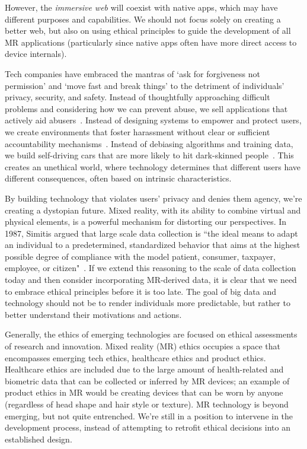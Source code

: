 However, the \emph{immersive web} will coexist with native apps, which may have different purposes and capabilities. We should not focus solely on creating a better web, but also on using ethical principles to guide the development of all MR applications (particularly since native apps often have more direct access to device internals).

Tech companies have embraced the mantras of `ask for forgiveness not permission' and `move fast and break things' to the detriment of individuals' privacy, security, and safety. Instead of thoughtfully approaching difficult problems and considering how we can prevent abuse, we sell applications that actively aid abusers~\cite{dell}. Instead of designing systems to empower and protect users, we create environments that foster harassment without clear or sufficient accountability mechanisms~\cite{dreyfuss}. Instead of debiasing algorithms and training data, we build self-driving cars that are more likely to hit dark-skinned people~\cite{wilson2019predictive}. This creates an unethical world, where technology determines that different users have different consequences, often based on intrinsic characteristics.

By building technology that violates users' privacy and denies them agency, we're creating a dystopian future. Mixed reality, with its ability to combine virtual and physical elements, is a powerful mechanism for distorting our perspectives.  In 1987, Simitis argued that large scale data collection is ``the ideal means to adapt an individual to a predetermined, standardized behavior that aims at the highest possible degree of compliance with the model patient, consumer, taxpayer, employee, or citizen"~\cite{simitis}. If we extend this reasoning to the scale of data collection today and then consider incorporating MR-derived data, it is clear that we need to embrace ethical principles before it is too late. The goal of big data and technology should not be to render individuals more predictable, but rather to better understand their motivations and actions.

Generally, the ethics of emerging technologies are focused on ethical assessments of research and innovation. Mixed reality (MR) ethics occupies a space that encompasses emerging tech ethics, healthcare ethics and product ethics. Healthcare ethics are included due to the large amount of health-related and biometric data that can be collected or inferred by MR devices; an example of product ethics in MR would be creating devices that can be worn by anyone (regardless of head shape and hair style or texture). MR technology is beyond emerging, but not quite entrenched. We're still in a position to intervene in the development process, instead of attempting to retrofit ethical decisions into an established design.

